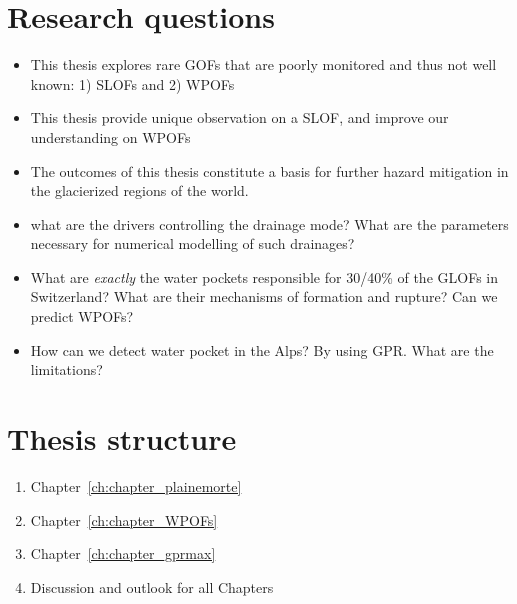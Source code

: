 

\section{Research questions}


\begin{itemize}
   \item This thesis explores rare GOFs that are poorly monitored and thus not well known: 1) SLOFs and 2) WPOFs
    \item This thesis provide unique observation on a SLOF, and improve our understanding on WPOFs 
    \item The outcomes of this thesis constitute a basis for further hazard mitigation in the glacierized regions of the world.
    \item  what are the drivers controlling the drainage mode? What are the parameters necessary for numerical modelling of such drainages?
    \item What are \textit{exactly} the water pockets responsible for 30/40\% of the GLOFs in Switzerland? What are their mechanisms of formation and rupture? Can we predict WPOFs?
    \item  How can we detect water pocket in the Alps? By using GPR. What are the limitations?
\end{itemize}

\section{Thesis structure}


\begin{enumerate}
\item Chapter~\ref{ch:chapter_plainemorte}
\item Chapter~\ref{ch:chapter_WPOFs}
\item Chapter~\ref{ch:chapter_gprmax}
\item Discussion and outlook for all Chapters
\end{enumerate}


